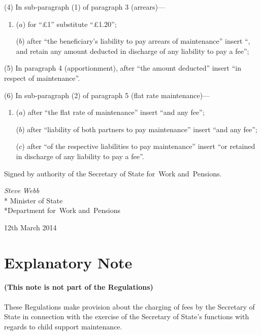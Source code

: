 \documentclass[12pt,a4paper]{article}
\begin{document}
(4) In sub-paragraph (1) of paragraph 3 (arrears)—
\begin{enumerate}\item[]
($a$) for “£1” substitute “£1$.$20”;

($b$) after “the beneficiary’s liability to pay arrears of maintenance” insert “, and retain any amount deducted in discharge of any liability to pay a fee”;
\end{enumerate}

(5) In paragraph 4 (apportionment), after “the amount deducted” insert “in respect of maintenance”.

(6) In sub-paragraph (2) of paragraph 5 (flat rate maintenance)—
\begin{enumerate}\item[]
($a$) after “the flat rate of maintenance” insert “and any fee”;

($b$) after “liability of both partners to pay maintenance” insert “and any fee”;

($c$) after “of the respective liabilities to pay maintenance” insert “or retained in discharge of any liability to pay a fee”.
\end{enumerate}

\bigskip

\pagebreak[3]

Signed 
by authority of the 
Secretary of State for~Work and~Pensions.

{\raggedleft
\emph{Steve Webb}\\*
Minister
of State\\*Department 
for~Work and~Pensions

}

12th March 2014

\small

\part{Explanatory Note}

\renewcommand\parthead{— Explanatory Note}

\subsection*{(This note is not part of the Regulations)}

These Regulations make provision about the charging of fees by the Secretary of State in connection with the exercise of the Secretary of State’s functions with regards to child support maintenance.
\end{document}
